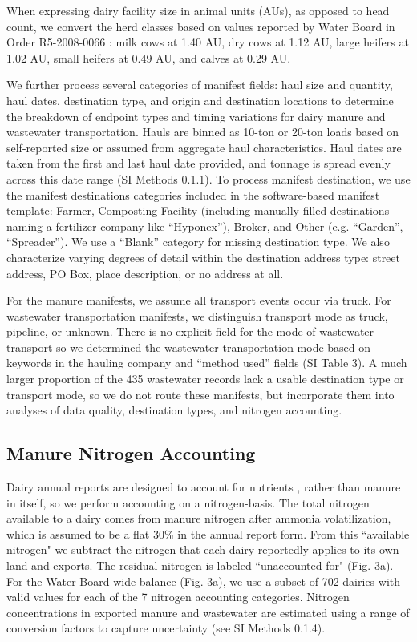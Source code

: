 \documentclass{iopjournal}
\begin{document}
When expressing dairy facility size in animal units (AUs), as opposed to head count, we convert the herd classes based on values reported by Water Board in Order R5-2008-0066 \cite{Dairy_Order_2008}: milk cows at 1.40 AU, dry cows at 1.12 AU, large heifers at 1.02 AU, small heifers at 0.49 AU, and calves at 0.29 AU.

We further process several categories of manifest fields: haul size and quantity, haul dates, destination type, and origin and destination locations to determine the breakdown of endpoint types and timing variations for dairy manure and wastewater transportation. Hauls are binned as 10-ton or 20-ton loads \cite{Harrigan_1997} based on self-reported size or assumed from aggregate haul characteristics. Haul dates are taken from the first and last haul date provided, and tonnage is spread evenly across this date range (SI Methods 0.1.1). To process manifest destination, we use the manifest destinations categories included in the software-based manifest template: Farmer, Composting Facility (including manually-filled destinations naming a fertilizer company like ``Hyponex''), Broker, and Other (e.g. ``Garden'', ``Spreader''). We use a ``Blank'' category for missing destination type. We also characterize varying degrees of detail within the destination address type: street address, PO Box, place description, or no address at all.
 
For the manure manifests, we assume all transport events occur via truck. For wastewater transportation manifests, we distinguish transport mode as truck, pipeline, or unknown. There is no explicit field for the mode of wastewater transport so we determined the wastewater transportation mode based on keywords in the hauling company and ``method used'' fields (SI Table 3). A much larger proportion of the 435 wastewater records lack a usable destination type or transport mode, so we do not route these manifests, but incorporate them into analyses of data quality, destination types, and nitrogen accounting.

\subsection{Manure Nitrogen Accounting}
Dairy annual reports are designed to account for nutrients \cite{CVRWQCB_2013_Order}, rather than manure in itself, so we perform accounting on a nitrogen-basis. The total nitrogen available to a dairy comes from manure nitrogen after ammonia volatilization, which is assumed to be a flat 30\% in the annual report form. From this ``available nitrogen" we subtract the nitrogen that each dairy reportedly applies to its own land and exports. The residual nitrogen is labeled ``unaccounted-for" (Fig. 3a). For the Water Board-wide balance (Fig. 3a), we use a subset of 702 dairies with valid values for each of the 7 nitrogen accounting categories. Nitrogen concentrations in exported manure and wastewater are estimated using a range of conversion factors to capture uncertainty \cite{Davis_Tech_Guide} (see SI Methods 0.1.4). 
\end{document}

